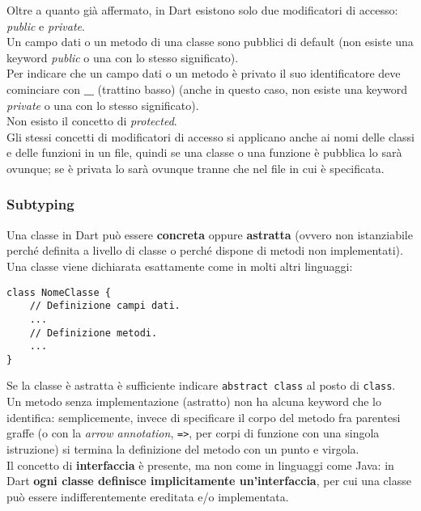 Oltre a quanto già affermato, in Dart esistono solo due modificatori di accesso: \emph{public} e \emph{private}.\\
Un campo dati o un metodo di una classe sono pubblici di default (non esiste una keyword \emph{public} o una con lo stesso significato).\\
Per indicare che un campo dati o un metodo è privato il suo identificatore deve cominciare con \textbf{\_} (trattino basso) (anche in questo caso, non esiste una keyword \emph{private} o una con lo stesso significato).\\
Non esisto il concetto di \emph{protected}.\\
Gli stessi concetti di modificatori di accesso si applicano anche ai nomi delle classi e delle funzioni in un file, quindi se una classe o una funzione è pubblica lo sarà ovunque; se è privata lo sarà ovunque tranne che nel file in cui è specificata.\\

\subsubsection{Subtyping}
\label{subsubsec:subtyping}

Una classe in Dart può essere \textbf{concreta} oppure \textbf{astratta} (ovvero non istanziabile perché definita a livello di classe o perché dispone di metodi non implementati).\\
Una classe viene dichiarata esattamente come in molti altri linguaggi:
\begin{lstlisting}
class NomeClasse {
    // Definizione campi dati.
    ...
    // Definizione metodi.
    ...
}
\end{lstlisting}
Se la classe è astratta è sufficiente indicare \texttt{abstract class} al posto di \texttt{class}.\\
Un metodo senza implementazione (astratto) non ha alcuna keyword che lo identifica: semplicemente, invece di specificare il corpo del metodo fra parentesi graffe (o con la \emph{arrow annotation}, \texttt{=>}, per corpi di funzione con una singola istruzione) si termina la definizione del metodo con un punto e virgola.\\
Il concetto di \textbf{interfaccia} è presente, ma non come in linguaggi come Java: in Dart \textbf{ogni classe definisce implicitamente un'interfaccia}, per cui una classe può essere indifferentemente ereditata e/o implementata.

